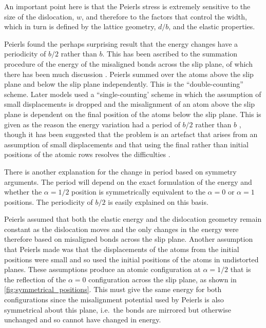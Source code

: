 An important point here is that the Peierls stress is extremely sensitive to the size of the dislocation, $w$, and therefore to the factors that control the width, which in turn is defined by the lattice geometry, $d/b$, and the elastic properties.



Peierls found the perhaps surprising result that the energy changes have a periodicity of $b/2$ rather than $b$. This has been ascribed to the summation procedure of the energy of the misaligned bonds across the slip plane, of which there has been much discussion \cite{Hirth_Lothe1982lattice_periodicity,Lu2000peierls}. Peierls summed over the atoms above the slip plane and below the slip plane independently. This is the ``double-counting'' scheme. Later models used a ``single-counting' scheme in which the assumption of small displacements is dropped and the misalignment of an atom above the slip plane is dependent on the final position of the atoms below the slip plane. This is given as the reason the energy variation had a period of $b/2$ rather than $b$ \cite{Hirth_Lothe1982lattice_periodicity,Lu2000peierls}, though it has been suggested that the problem is an artefact that arises from an assumption of small displacements and that using the final rather than initial positions of the atomic rows resolves the difficulties \cite{Huntington1955}. 

There is another explanation for the change in period based on symmetry arguments. The period will depend on the exact formulation of the energy and whether the $\alpha=1/2$ position is symmetrically equivalent to the $\alpha = 0$ or $ \alpha = 1$ positions. The periodicity of $b/2$ is easily explained on this basis.

Peierls assumed that both the elastic energy and the dislocation geometry remain constant as the dislocation moves and the only changes in the energy were therefore based on misaligned bonds across the slip plane. Another assumption that Peierls made was that the displacements of the atoms from the initial positions were small and so used the initial positions of the atoms in undistorted planes. These assumptions produce an atomic configuration at $\alpha=1/2$ that is the reflection of the $\alpha=0$ configuration across the slip plane, as shown in \autoref{fig:symmetrical_positions}. This must give the same energy for both configurations since the misalignment potential used by Peierls is  also symmetrical about this plane, i.e.\ the bonds are mirrored but otherwise unchanged and so cannot have changed in energy.

